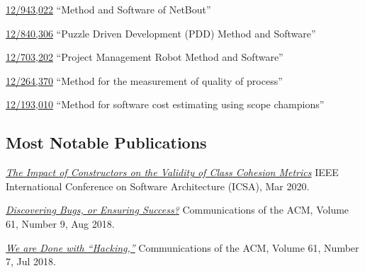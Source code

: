 \documentclass{yb}
\begin{document}
\href{https://patents.google.com/patent/US20120117164}{12/943,022}
``Method and Software of NetBout''

\href{https://patents.google.com/patent/US20120023476}{12/840,306}
``Puzzle Driven Development (PDD) Method and Software''

\href{https://patents.google.com/patent/US20110196798}{12/703,202}
``Project Management Robot Method and Software''

\href{https://patents.google.com/patent/US20100114638}{12/264,370}
``Method for the measurement of quality of process''

\href{https://patents.google.com/patent/US20100042968}{12/193,010}
``Method for software cost estimating using scope champions''

\subsection*{Most Notable Publications}

\begin{samepage}
\emph{\href{https://www.yegor256.com/pdf/2020/icsa20.pdf}{The Impact of Constructors on the Validity of Class Cohesion Metrics}}\newline
IEEE International Conference on Software Architecture (ICSA), Mar 2020.
\end{samepage}

\begin{samepage}
\emph{\href{https://www.yegor256.com/pdf/2018/discovering-bugs.pdf}{Discovering Bugs, or Ensuring Success?}}\newline
Communications of the ACM, Volume 61, Number 9, Aug 2018.
\end{samepage}

\begin{samepage}
\emph{\href{https://www.yegor256.com/pdf/2018/we-are-done-with-hacking.pdf}{We are Done with ``Hacking,''}}\newline
Communications of the ACM, Volume 61, Number 7, Jul 2018.
\end{samepage}


\end{document}
